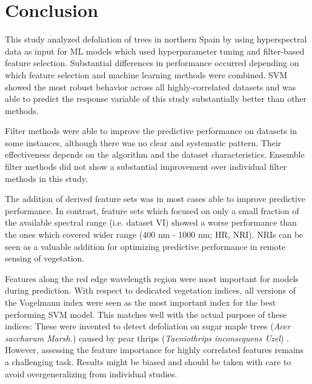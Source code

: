 \documentclass[journal]{IEEEtran}
\begin{document}
\section{Conclusion}

This study analyzed defoliation of trees in northern Spain by using hyperspectral data as input for ML models which used hyperparameter tuning and filter-based feature selection.
Substantial differences in performance occurred depending on which feature selection and machine learning methods were combined.
SVM showed the most robust behavior across all highly-correlated datasets and was able to predict the response variable of this study substantially better than other methods.

Filter methods were able to improve the predictive performance on datasets in some instances, although there was no clear and systematic pattern.
Their effectiveness depends on the algorithm and the dataset characteristics.
Ensemble filter methods did not show a substantial improvement over individual filter methods in this study.

The addition of derived feature sets was in most cases able to improve predictive performance.
In contrast, feature sets which focused on only a small fraction of the available spectral range (i.e. dataset VI) showed a worse performance than the ones which covered wider range (400 nm - 1000 nm; HR, NRI).
NRIs can be seen as a valuable addition for optimizing predictive performance in remote sensing of vegetation.

Features along the red edge wavelength region were most important for models during prediction.
With respect to dedicated vegetation indices, all versions of the Vogelmann index were seen as the most important index for the best performing SVM model.
This matches well with the actual purpose of these indices:
These were invented to detect defoliation on sugar maple trees (\textit{Acer saccharum Marsh.}) caused by pear thrips (\textit{Taeniothrips inconsequens Uzel}) \cite{vogelmann1993}.
However, assessing the feature importance for highly correlated features remains a challenging task.
Results might be biased and should be taken with care to avoid overgeneralizing from individual studies.
\end{document}
